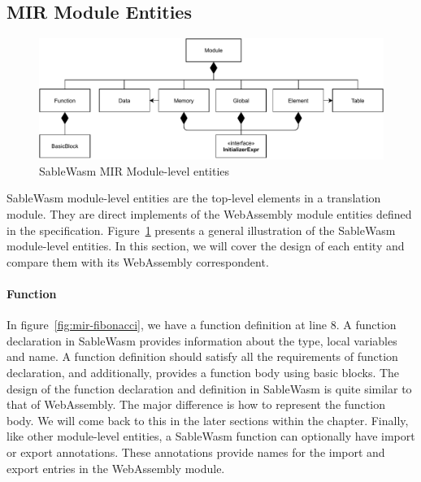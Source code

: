 \subsection{MIR Module Entities}

\begin{figure}
  \centering
  \includegraphics[width=\textwidth]{Images/4.MIR/module.pdf}
  \caption{SableWasm MIR Module-level entities}
  \label{fig:sablewasm-mir-module}
\end{figure}

SableWasm module-level entities are the top-level elements in a translation module. They are direct implements of the WebAssembly module entities defined in the specification. Figure~\ref{fig:sablewasm-mir-module} presents a general illustration of the SableWasm module-level entities. In this section, we will cover the design of each entity and compare them with its WebAssembly correspondent.

\paragraph{Function}
In figure~\ref{fig:mir-fibonacci}, we have a function definition at line 8. A function declaration in SableWasm provides information about the type, local variables and name. A function definition should satisfy all the requirements of function declaration, and additionally, provides a function body using basic blocks. The design of the function declaration and definition in SableWasm is quite similar to that of WebAssembly. The major difference is how to represent the function body. We will come back to this in the later sections within the chapter. Finally, like other module-level entities, a SableWasm function can optionally have import or export annotations. These annotations provide names for the import and export entries in the WebAssembly module.


